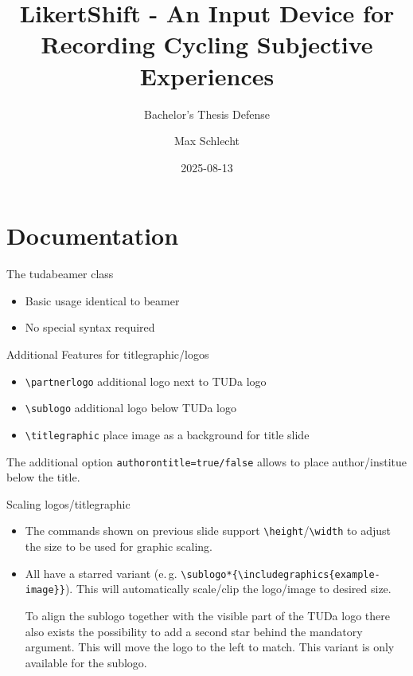 \documentclass[
    english,
    accentcolor=9c,
    design=2023,
    logofile=hulogo.pdf,
]{tudabeamer}
\title[LikertShift]{LikertShift - An Input Device for Recording Cycling Subjective Experiences}
\subtitle{Bachelor's Thesis Defense}
\author{Max Schlecht}
\institute{Humboldt-Universität zu Berlin}
\date{2025-08-13}
\newcommand*{\code}[1]{\texttt{#1}}
\begin{document}
\maketitle

\tableofcontents

\section{Documentation}

\begin{frame}{The tudabeamer class}
    \begin{itemize}
        \item Basic usage identical to beamer
        \item No special syntax required
    \end{itemize}
\end{frame}

\begin{frame}{Additional Features for titlegraphic/logos}
    \begin{itemize}
        \item \code{\textbackslash{}partnerlogo} additional logo next to TUDa logo
        \item \code{\textbackslash{}sublogo} additional logo below TUDa logo
        \item \code{\textbackslash{}titlegraphic} place image as a background for title slide
    \end{itemize}
    The additional option \code{authorontitle=true/false} allows to place author/institue below the title.
\end{frame}

\begin{frame}{Scaling logos/titlegraphic}
    \begin{itemize}
        \item The commands shown on previous slide support \code{\textbackslash{}height}/\code{\textbackslash{}width} to adjust the size to be used for graphic scaling.
        \item All have a starred variant (e.\,g. \code{\textbackslash{}sublogo*\{\textbackslash{}includegraphics\{example-image\}\}}). This will automatically scale/clip the logo/image to desired size.

            To align the sublogo together with the visible part of the TUDa logo there also exists the possibility to add a second star behind the mandatory argument. This will move the logo to the left to match. This variant is only available for the sublogo.
    \end{itemize}
\end{frame}
\end{document}
